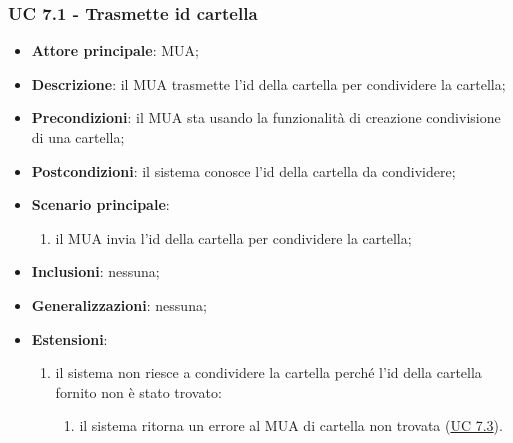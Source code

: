     \subsubsection{UC 7.1 - Trasmette id cartella} \label{sec:UC7.1}
    \begin{itemize}
        \item \textbf{Attore principale}: MUA;
        \item \textbf{Descrizione}: il MUA trasmette l'id della cartella per condividere la cartella;
        \item \textbf{Precondizioni}: il MUA sta usando la funzionalità di creazione condivisione di una cartella;
        \item \textbf{Postcondizioni}: il sistema conosce l'id della cartella da condividere;
        \item \textbf{Scenario principale}:
            \begin{enumerate}
                \item il MUA invia l'id della cartella per condividere la cartella;
            \end{enumerate}
        \item \textbf{Inclusioni}: nessuna;
        \item \textbf{Generalizzazioni}: nessuna;
        \item \textbf{Estensioni}:
            \begin{enumerate}[label=\alph*.]
                \item il sistema non riesce a condividere la cartella perché l'id della cartella fornito non è stato trovato:
                \begin{enumerate}[label=\arabic*.]
                    \item il sistema ritorna un errore al MUA di cartella non trovata (\hyperref[sec:UC7.3]{UC 7.3}).
                \end{enumerate}
            \end{enumerate}
    \end{itemize}



